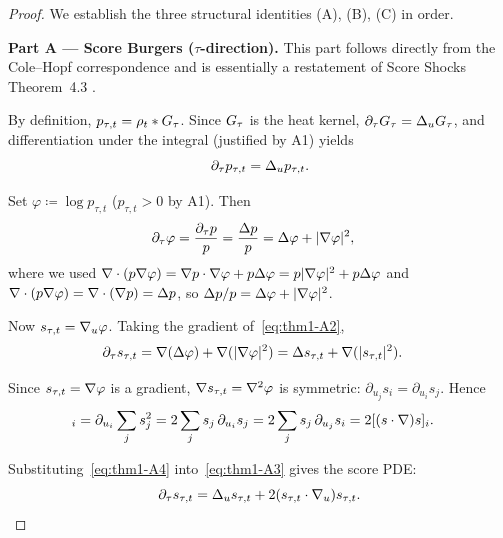 \begin{proof}
We establish the three structural identities (A), (B), (C) in order.

\medskip
\noindent
\textbf{Part A --- Score Burgers ($\tau$-direction).}
This part follows directly from the Cole--Hopf correspondence and is essentially a restatement of Score Shocks Theorem~4.3 \citep{sarkar2026scoreshocks}.

By definition, $p_{\tau, t} = \rho_{t} * G_{\tau}$. Since $G_{\tau}$ is the heat kernel, $\partial_{\tau} G_{\tau} = \Delta_{u} G_{\tau}$, and differentiation under the integral (justified by A1) yields
\begin{equation}
\partial_{\tau} p_{\tau, t} = \Delta_{u} p_{\tau, t}.
\label{eq:thm1-A1}
\end{equation}

Set $\varphi \coloneqq \log p_{\tau, t}$ ($p_{\tau, t} > 0$ by A1). Then
\begin{align}
\partial_{\tau} \varphi
&= \frac{\partial_{\tau} p}{p}
 = \frac{\Delta p}{p}
 = \Delta \varphi + \lvert \nabla \varphi \rvert^{2},
\label{eq:thm1-A2}
\end{align}
where we used $\nabla \cdot (p \nabla \varphi) = \nabla p \cdot \nabla \varphi + p \Delta \varphi = p \lvert \nabla \varphi \rvert^{2} + p \Delta \varphi$ and $\nabla \cdot (p \nabla \varphi) = \nabla \cdot (\nabla p) = \Delta p$, so $\Delta p / p = \Delta \varphi + \lvert \nabla \varphi \rvert^{2}$.

Now $s_{\tau, t} = \nabla_{u} \varphi$. Taking the gradient of~\eqref{eq:thm1-A2},
\begin{align}
\partial_{\tau} s_{\tau, t}
&= \nabla(\Delta \varphi) + \nabla(\lvert \nabla \varphi \rvert^{2})
 = \Delta s_{\tau, t} + \nabla(\lvert s_{\tau, t} \rvert^{2}).
\label{eq:thm1-A3}
\end{align}

Since $s_{\tau, t} = \nabla \varphi$ is a gradient, $\nabla s_{\tau, t} = \nabla^{2} \varphi$ is symmetric: $\partial_{u_{j}} s_{i} = \partial_{u_{i}} s_{j}$. Hence
\begin{align}
[\nabla(\abs{\score}^{2})]_{i}
&= \partial_{u_{i}} \sum_{j} s_{j}^{2}
 = 2 \sum_{j} s_{j} \, \partial_{u_{i}} s_{j}
 = 2 \sum_{j} s_{j} \, \partial_{u_{j}} s_{i}
 = 2[(\score \cdot \nabla) \score]_{i}.
\label{eq:thm1-A4}
\end{align}

Substituting~\eqref{eq:thm1-A4} into~\eqref{eq:thm1-A3} gives the score PDE:
\begin{equation}
\partial_{\tau} s_{\tau, t} = \Delta_{u} s_{\tau, t} + 2 (s_{\tau, t} \cdot \nabla_{u}) s_{\tau, t}.
\label{eq:thm1-A5}
\end{equation}


\end{proof}
